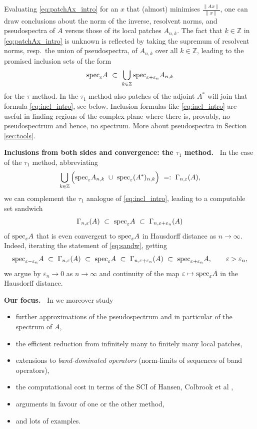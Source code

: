 \documentclass{article}
\newcommand\Simon[1]{\marginpar{\textcolor{red}{\tt #1}}}
\newcommand\Z{{\mathbb Z}}
\newcommand\eps{{\varepsilon}}
\newcommand\specn{{\rm spec}}   %
\newcommand\speps{{\rm spec}_\eps}
\numberwithin{equation}{section}   %
\numberwithin{figure}{section}  %
\begin{document}
Evaluating \eqref{eq:patchAx_intro} for an $x$ that (almost) minimises $\frac{\|Ax\|}{\|x\|}$, one can draw conclusions about the norm of the inverse, resolvent norms, and pseudospectra of $A$ versus those of its local patches $A_{n,k}$. The fact that $k\in\Z$ in \eqref{eq:patchAx_intro} is unknown is reflected by taking the supremum of resolvent norms, resp.~the union of pseudospectra, of $A_{n,k}$ over all $k\in\Z$, leading to the promised inclusion sets of the form
\begin{equation} \label{eq:incl_intro}
\speps A\ \subset\ \bigcup_{k\in\Z} \specn_{\eps+\eps_n} A_{n,k}
\end{equation}
for the $\tau$ method. In the $\tau_1$ method also patches of the adjoint $A^*$ will join that formula \eqref{eq:incl_intro}, see below. Inclusion formulas like \eqref{eq:incl_intro} are useful in finding regions of the complex plane where there is, provably, no pseudospectrum and hence, no spectrum. More about pseudospectra in Section \ref{sec:tools}.



\medskip\noindent
{\bf Inclusions from both sides and convergence: the $\tau_1$ method.\ }
In the case of the $\tau_1$ method, abbreviating
\[
\bigcup_{k\in\Z} \Big(\speps A_{n,k}\ \cup\ \speps (A^*)_{n,k}\Big)\ =:\ \Gamma_{n,\eps}(A),
\]
we can complement the $\tau_1$ analogue of \eqref{eq:incl_intro}, leading to a computable set sandwich 
\begin{equation} \label{eq:sandw}
\Gamma_{n,\eps}(A)\ \subset\ \speps A\ \subset\ \Gamma_{n,\eps+\eps_n}(A)
\end{equation}
of $\speps A$  that is even convergent to $\speps A$ in Hausdorff distance as $n\to\infty$.
Indeed, iterating the statement of \eqref{eq:sandw}, getting
\[
\specn_{\eps-\eps_n} A\ \subset\ \Gamma_{n,\eps}(A)\ \subset\ \speps A\ \subset\ \Gamma_{n,\eps+\eps_n}(A)\ \subset\ \specn_{\eps+\eps_n} A,\qquad \eps>\eps_n,
\]
we argue by $\eps_n\to 0$ as $n\to\infty$ and continuity of the map $\eps\mapsto\speps A$ in the Hausdorff distance.


\medskip\noindent
{\bf Our focus.\ }
In \cite{CW.Heng.ML:JST} we moreover study
\begin{itemize} \itemsep-1mm
\item further approximations of the pseudospectrum and in particular of the spectrum of $A$,
\item the efficient reduction from infinitely many to finitely many local patches,
\item extensions to {\sl band-dominated operators} (norm-limits of sequences of band operators),
\item the computational cost in terms of the SCI of Hansen, Colbrook et al \cite{SCIshort,SCI},
\item arguments in favour of one or the other method,
\item and lots of examples.
\end{itemize}
\end{document}
